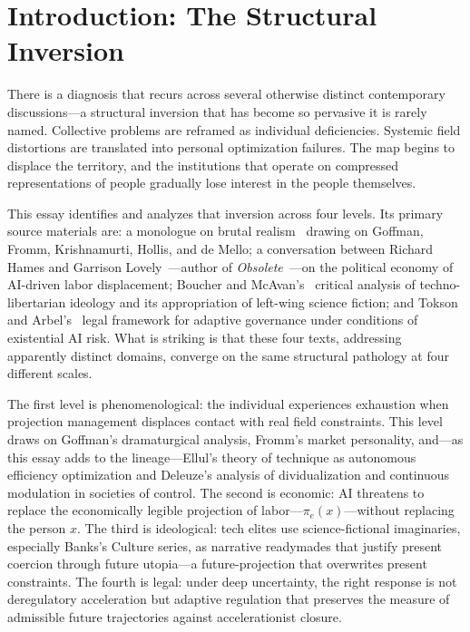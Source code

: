 \documentclass[12pt, a4paper]{article}
\theoremstyle{plain}
\theoremstyle{definition}
\theoremstyle{remark}
\begin{document}
\newpage
\tableofcontents
\newpage

\section{Introduction: The Structural Inversion}

There is a diagnosis that recurs across several otherwise distinct contemporary
discussions---a structural inversion that has become so pervasive it is rarely named.
Collective problems are reframed as individual deficiencies.
Systemic field distortions are translated into personal optimization failures.
The map begins to displace the territory, and the institutions that operate on
compressed representations of people gradually lose interest in the people themselves.

This essay identifies and analyzes that inversion across four levels.
Its primary source materials are: a monologue on brutal realism~\cite{brutrealism}
drawing on Goffman, Fromm, Krishnamurti, Hollis, and de Mello; a conversation
between Richard Hames and Garrison Lovely~\cite{novaralively}---author of
\textit{Obsolete}~\cite{lovely2025}---on the political economy of AI-driven labor
displacement; Boucher and McAvan's~\cite{BoucherMcAvan2026} critical analysis of
techno-libertarian ideology and its appropriation of left-wing science fiction; and
Tokson and Arbel's~\cite{ToksonArbel2027} legal framework for adaptive governance
under conditions of existential AI risk.
What is striking is that these four texts, addressing apparently distinct domains,
converge on the same structural pathology at four different scales.

The first level is phenomenological: the individual experiences exhaustion when
projection management displaces contact with real field constraints.
This level draws on Goffman's dramaturgical analysis, Fromm's market personality,
and---as this essay adds to the lineage---Ellul's theory of technique as autonomous
efficiency optimization and Deleuze's analysis of dividualization and continuous
modulation in societies of control.
The second is economic: AI threatens to replace the economically legible projection
of labor---$\pi_e(x)$---without replacing the person $x$.
The third is ideological: tech elites use science-fictional imaginaries,
especially Banks's Culture series, as narrative readymades that justify present
coercion through future utopia---a future-projection that overwrites present constraints.
The fourth is legal: under deep uncertainty, the right response is not deregulatory
acceleration but adaptive regulation that preserves the measure of admissible future
trajectories against accelerationist closure.
\end{document}
